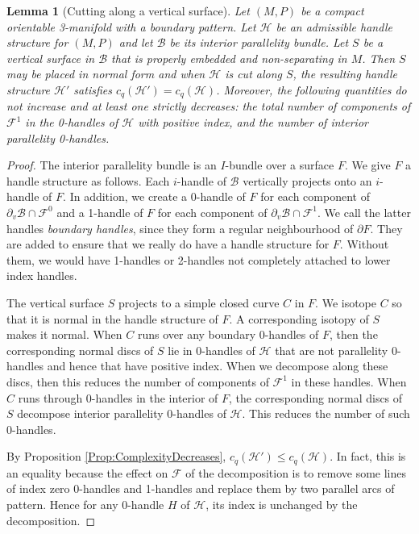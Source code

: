 \documentclass[oneside]{amsart}
\numberwithin{equation}{section}
\theoremstyle{plain}
\newtheorem{lemma}[equation]{Lemma}
\theoremstyle{definition}
\begin{document}
\begin{lemma}[Cutting along a vertical surface]
\label{Lem:CutAlongVertical}
Let $(M,P)$ be a compact orientable 3-manifold with a boundary pattern. Let $\mathcal{H}$ be an admissible handle structure for $(M,P)$ and let $\mathcal{B}$ be its interior parallelity bundle. Let $S$ be a vertical surface in $\mathcal{B}$ that is properly embedded and non-separating in $M$. Then $S$ may be placed in normal form and when $\mathcal{H}$ is cut along $S$, the resulting handle structure $\mathcal{H}'$ satisfies $c_q(\mathcal{H}') = c_q(\mathcal{H})$. Moreover, the following quantities do not increase and at least one strictly decreases: the total number of components of $\mathcal{F}^1$ in the 0-handles of $\mathcal{H}$ with positive index, and the number of interior parallelity 0-handles.
\end{lemma}

\begin{proof}
The interior parallelity bundle is an $I$-bundle over a surface $F$. We give $F$ a handle structure as follows. Each $i$-handle of $\mathcal{B}$ vertically projects onto an $i$-handle of $F$. In addition, we create a 0-handle of $F$ for each component of $\partial_v \mathcal{B} \cap \mathcal{F}^0$ and a 1-handle of $F$ for each component of $\partial_v \mathcal{B} \cap \mathcal{F}^1$. We call the latter handles \emph{boundary handles}, since they form a regular neighbourhood of $\partial F$. They are added to ensure that we really do have a handle structure for $F$. Without them, we would have 1-handles or 2-handles not completely attached to lower index handles.

The vertical surface $S$ projects to a simple closed curve $C$ in $F$. We isotope $C$ so that it is normal in the handle structure of $F$. A corresponding isotopy of $S$ makes it normal. When $C$ runs over any boundary 0-handles of $F$, then the corresponding normal discs of $S$ lie in 0-handles of $\mathcal{H}$ that are not parallelity 0-handles and hence that have positive index. When we decompose along these discs, then this reduces the number of components of $\mathcal{F}^1$ in these handles. When $C$ runs through 0-handles in the interior of $F$, the corresponding normal discs of $S$ decompose interior parallelity 0-handles of $\mathcal{H}$. This reduces the number of such 0-handles.

By Proposition \ref{Prop:ComplexityDecreases}, $c_q(\mathcal{H}') \leq c_q(\mathcal{H})$. In fact, this is an equality because the effect on $\mathcal{F}$ of the decomposition is to remove some lines of index zero 0-handles and 1-handles and replace them by two parallel arcs of pattern. Hence for any 0-handle $H$ of $\mathcal{H}$, its index is unchanged by the decomposition.
\end{proof}
\end{document}
